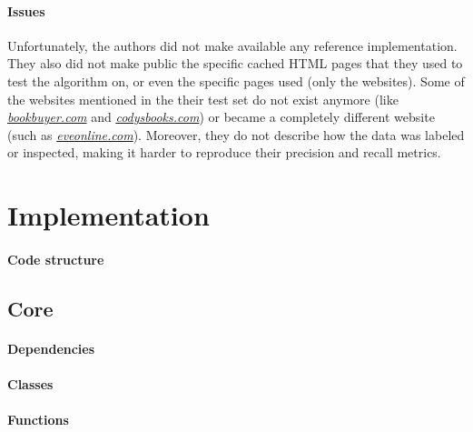 \documentclass[11pt]{article}
\begin{document}
\paragraph{Issues}

Unfortunately, the authors did not make available any reference implementation. They also did not make public the specific cached HTML pages that they used to test the algorithm on, or even the specific pages used (only the websites). Some of the websites mentioned in the their test set do not exist anymore (like \href{http://www.bookbuyer.com}{\textit{bookbuyer.com}} and \href{http://www.codysbooks.com}{\textit{codysbooks.com}}) or became a completely different website (such as \href{https://www.eveonline.com/}{\textit{eveonline.com}}). Moreover, they do not describe how the data was labeled or inspected, making it harder to reproduce their precision and recall metrics.

\section{Implementation}

\paragraph{Code structure}

\subsection{Core}

\paragraph{Dependencies}

\paragraph{Classes}

\paragraph{Functions}
\end{document}
